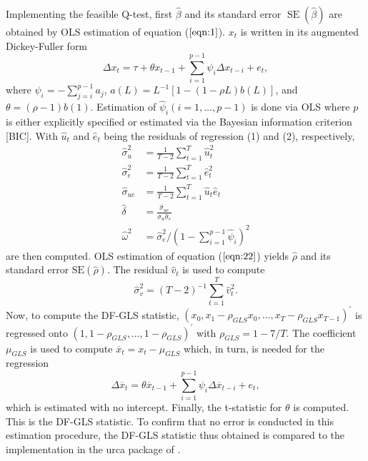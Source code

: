 \documentclass[11pt, a4paper]{article}
\begin{document}
Implementing the feasible Q-test, first $\hat{\beta}$ and its standard error $\operatorname{SE}(\widehat{\beta})$ are obtained by OLS estimation of equation ($\ref{eqn:1}$). $x_{t}$ is written in its augmented Dickey-Fuller form
\begin{equation}
\Delta x_{t}=\tau+\theta x_{t-1}+\sum_{i=1}^{p-1} \psi_{i} \Delta x_{t-i}+e_{t},
\end{equation}
where $\psi_{i}=-\sum_{j=i}^{p-1} a_{j}$, $a(L)=L^{-1}[1-(1-\rho L) b(L)]$, and $\theta=(\rho-1) b(1)$. Estimation of $\widehat{\psi}_{i}(i=1, \ldots, p-1)$ is done via OLS where $p$ is either explicitly specified or estimated via the Bayesian information criterion [BIC].
With $\widehat{u}_{t}$ and $\widehat{e}_{t}$ being the residuals of regression (1) and (2), respectively,
\begin{align} \widehat{\sigma}_{u}^{2} &=\frac{1}{T-2} \sum_{t=1}^{T} \widehat{u}_{t}^{2} \\ \widehat{\sigma}_{e}^{2} &=\frac{1}{T-2} \sum_{t=1}^{T} \widehat{e}_{t}^{2} \\ \widehat{\sigma}_{u e} &=\frac{1}{T-2} \sum_{t=1}^{T} \widehat{u}_{t} \widehat{e}_{t} \\ \widehat{\delta} &=\frac{\widehat{\sigma}_{u e}}{\widehat{\sigma}_{u} \widehat{\sigma}_{e}} \\ \widehat{\omega}^{2}&=\widehat{\sigma}_{e}^{2} /\left(1-\sum_{i=1}^{p-1} \widehat{\psi}_{i}\right)^{2}
\end{align}
are then computed. OLS estimation of equation ($\ref{eqn:22}$) yields $\widehat{\rho}$ and its standard error $\mathrm{SE}(\widehat{\rho})$. The residual $\widehat{v}_{t}$ is used to compute 
\begin{equation}
\widehat{\sigma}_{v}^{2}=(T-2)^{-1} \sum_{t=1}^{T} \widehat{v}_{t}^{2}.
\end{equation} 
Now, to compute the DF-GLS statistic, $\left(x_{0}, x_{1}-\rho_{G L S} x_{0}, \ldots, x_{T}-\rho_{G L S} x_{T-1}\right)^{\prime}$ is regressed onto 
$\left(1,1-\rho_{G L S}, \ldots, 1-\rho_{G L S}\right)^{\prime}$ with $\rho_{G L S}=1-7 / T$. The coefficient $\mu_{G L S}$ is used to compute $\overline{x}_{t}=x_{t}-\mu_{G L S}$ which, in turn, is needed for the regression 
\begin{equation}
\Delta \overline{x}_{t}=\theta \overline{x}_{t-1}+\sum_{i=1}^{p-1} \psi_{i} \Delta \overline{x}_{t-i}+e_{t},
\end{equation} which is estimated with no intercept. Finally, the t-statistic for $\theta$ is computed. This is the DF-GLS statistic. To confirm that no error is conducted in this estimation procedure, the DF-GLS statistic thus obtained is compared to the implementation in the urca package of \citet{urca}. 
\end{document}
